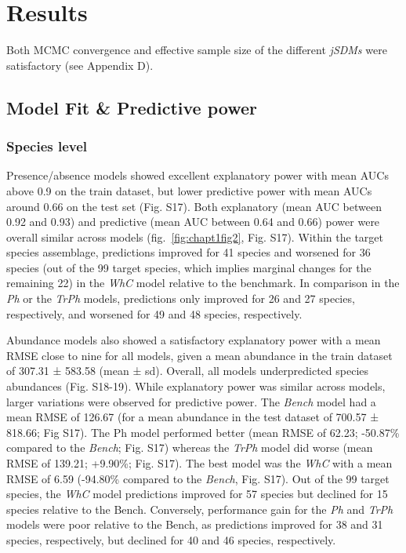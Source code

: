 \documentclass[9pt,biorxiv,doublespacing,lineno]{lapreprint}
\begin{document}


\hypertarget{results}{%
\section{Results}\label{results}}

Both MCMC convergence and effective sample size of the different
\emph{jSDMs} were satisfactory (see Appendix D).

\hypertarget{model-fit-predictive-power}{%
\subsection{Model Fit \& Predictive
power}\label{model-fit-predictive-power}}

\hypertarget{species-level}{%
\subsubsection{Species level}\label{species-level}}

Presence/absence models showed excellent explanatory power with mean
AUCs above 0.9 on the train dataset, but lower predictive power with
mean AUCs around 0.66 on the test set (Fig. S17). Both explanatory (mean
AUC between 0.92 and 0.93) and predictive (mean AUC between 0.64 and
0.66) power were overall similar across models
(fig.~\ref{fig:chapt1fig2}, Fig. S17). Within the target species
assemblage, predictions improved for 41 species and worsened for 36
species (out of the 99 target species, which implies marginal changes
for the remaining 22) in the \emph{WhC} model relative to the benchmark.
In comparison in the \emph{Ph} or the \emph{TrPh} models, predictions
only improved for 26 and 27 species, respectively, and worsened for 49
and 48 species, respectively.

Abundance models also showed a satisfactory explanatory power with a
mean RMSE close to nine for all models, given a mean abundance in the
train dataset of 307.31 ± 583.58 (mean ± sd). Overall, all models
underpredicted species abundances (Fig. S18-19). While explanatory power
was similar across models, larger variations were observed for
predictive power. The \emph{Bench} model had a mean RMSE of 126.67 (for
a mean abundance in the test dataset of 700.57 ± 818.66; Fig S17). The
Ph model performed better (mean RMSE of 62.23; -50.87\% compared to the
\emph{Bench}; Fig. S17) whereas the \emph{TrPh} model did worse (mean
RMSE of 139.21; +9.90\%; Fig. S17). The best model was the \emph{WhC}
with a mean RMSE of 6.59 (-94.80\% compared to the \emph{Bench}, Fig.
S17). Out of the 99 target species, the \emph{WhC} model predictions
improved for 57 species but declined for 15 species relative to the
Bench. Conversely, performance gain for the \emph{Ph} and \emph{TrPh}
models were poor relative to the Bench, as predictions improved for 38
and 31 species, respectively, but declined for 40 and 46 species,
respectively.
\end{document}
